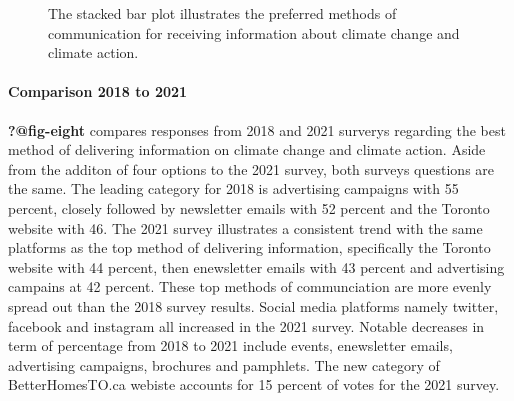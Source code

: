 \documentclass[
  letterpaper,
  DIV=11,
  numbers=noendperiod]{scrartcl}
\let\oldparagraph\paragraph
\renewcommand{\paragraph}[1]{\oldparagraph{#1}\mbox{}}
\begin{document}
\begin{figure}


\caption{\label{fig-seven}The stacked bar plot illustrates the preferred
methods of communication for receiving information about climate change
and climate action.}

\end{figure}%

\paragraph{Comparison 2018 to 2021}\label{comparison-2018-to-2021-3}

\textbf{?@fig-eight} compares responses from 2018 and 2021 surverys
regarding the best method of delivering information on climate change
and climate action. Aside from the additon of four options to the 2021
survey, both surveys questions are the same. The leading category for
2018 is advertising campaigns with 55 percent, closely followed by
newsletter emails with 52 percent and the Toronto website with 46. The
2021 survey illustrates a consistent trend with the same platforms as
the top method of delivering information, specifically the Toronto
website with 44 percent, then enewsletter emails with 43 percent and
advertising campains at 42 percent. These top methods of communciation
are more evenly spread out than the 2018 survey results. Social media
platforms namely twitter, facebook and instagram all increased in the
2021 survey. Notable decreases in term of percentage from 2018 to 2021
include events, enewsletter emails, advertising campaigns, brochures and
pamphlets. The new category of BetterHomesTO.ca webiste accounts for 15
percent of votes for the 2021 survey.
\end{document}
